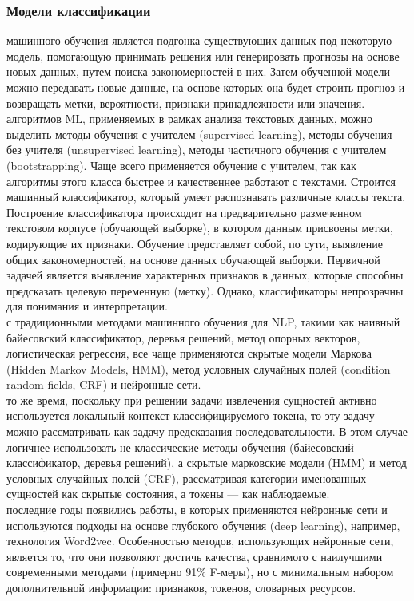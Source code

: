 \documentclass{article}
\newcommand\tab[1][1cm]{\hspace*{#1}}
\begin{document}
\subsubsection{Модели классификации}
 машинного обучения является подгонка существующих данных под некоторую модель, помогающую принимать решения или генерировать прогнозы на основе новых данных, путем поиска закономерностей в них. Затем обученной модели можно передавать новые данные, на основе которых она будет строить прогноз и возвращать метки, вероятности, признаки принадлежности или значения.\\
 алгоритмов ML, применяемых в рамках анализа текстовых данных, можно выделить методы обучения с учителем (supervised learning), методы обучения без учителя (unsupervised learning), методы частичного обучения с учителем (bootstrapping). Чаще всего применяется обучение с учителем, так как алгоритмы этого класса быстрее и качественнее работают с текстами. Строится машинный классификатор, который умеет распознавать различные классы текста. Построение классификатора происходит на предварительно размеченном текстовом корпусе (обучающей выборке), в котором данным присвоены метки, кодирующие их признаки. Обучение представляет собой, по сути, выявление общих закономерностей, на основе данных обучающей выборки. Первичной задачей является выявление характерных признаков в данных, которые способны предсказать целевую переменную (метку). Однако, классификаторы непрозрачны для понимания и интерпретации.\\
 с традиционными методами машинного обучения для NLP, такими как наивный байесовский классификатор, деревья решений, метод опорных векторов, логистическая регрессия, все чаще применяются скрытые модели Маркова (Hidden Markov Models, HMM), метод условных случайных полей (condition random fields, CRF) и нейронные сети.\\
 то же время, поскольку при решении задачи извлечения сущностей активно используется локальный контекст классифицируемого токена, то эту задачу можно рассматривать как задачу предсказания последовательности. В этом случае логичнее использовать не классические методы обучения (байесовский классификатор, деревья решений), а скрытые марковские модели (HMM) и метод условных случайных полей (CRF), рассматривая категории именованных сущностей как скрытые состояния, а токены — как наблюдаемые.\\
 последние годы появились работы, в которых применяются нейронные сети и используются подходы на основе глубокого обучения (deep learning), например, технология Word2vec. Особенностью методов, использующих нейронные сети, является то, что они позволяют достичь качества, сравнимого с наилучшими современными методами (примерно 91\% F-меры), но с минимальным набором дополнительной информации: признаков, токенов, словарных ресурсов.\\
\end{document}
